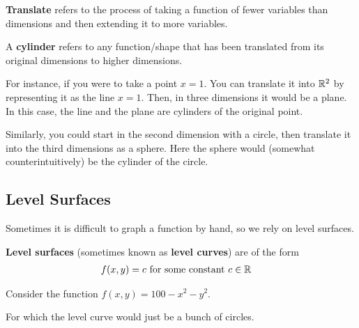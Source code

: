 \begin{definition}
    \textbf{Translate} refers to the process of taking a function of fewer variables than dimensions and then extending it to more variables.
\end{definition}

\begin{definition}
    A \textbf{cylinder} refers to any function/shape that has been translated from its original dimensions to higher dimensions.
\end{definition}

For instance, if you were to take a point $x = 1$. You can translate it into $\mathbb{R}^2$ by representing it as the line $x = 1$.
Then, in three dimensions it would be a plane. In this case, the line and the plane are cylinders of the original point.

Similarly, you could start in the second dimension with a circle, then translate it into the third dimensions as a sphere. Here the sphere would
(somewhat counterintuitively) be the cylinder of the circle.

\subsection{Level Surfaces}
Sometimes it is difficult to graph a function by hand, so we rely on level surfaces.
\begin{definition}
    \textbf{Level surfaces} (sometimes known as \textbf{level curves}) are of the form
    \begin{align*}
        f(x,y) &= c \text{ for some constant $c \in \mathbb{R}$}
    \end{align*}

    \begin{example}
        Consider the function $f(x,y) = 100 - x^2 -y^2$.
        

        For which the level curve would just be a bunch of circles. %
    \end{example}

\end{definition}